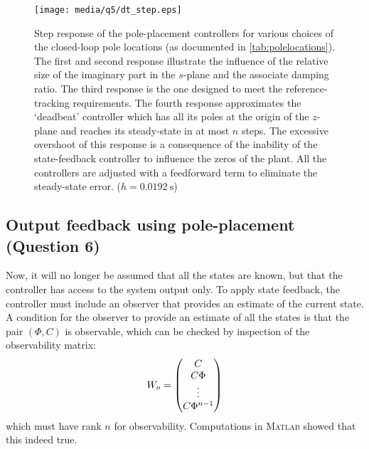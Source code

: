 \begin{figure}[ht]
    \centering
    \texttt{[image: media/q5/dt\_step.eps]}
    \caption{Step response of the pole-placement controllers for various choices of the closed-loop pole locations (as documented in \cref{tab:polelocations}). The first and second response illustrate the influence of the relative size of the imaginary part in the $s$-plane and the associate damping ratio. The third response is the one designed to meet the reference-tracking requirements. The fourth response approximates the `deadbeat' controller which has all its poles at the origin of the $z$-plane and reaches its steady-state in at most $n$ steps. The excessive overshoot of this response is a consequence of the inability of the state-feedback controller to influence the zeros of the plant. All the controllers are adjusted with a feedforward term to eliminate the steady-state error. ($h = \SI{0.0192}{\second}$)}
    \label{fig:q5_step}
\end{figure}

\subsection{Output feedback using pole-placement \textnormal{\phantom{xxx}(Question 6)}}
\label{sec:ss_output}
Now, it will no longer be assumed that all the states are known, but that the controller has access to the system output only. To apply state feedback, the controller must include an observer that provides an estimate of the current state. A condition for the observer to provide an estimate of all the states is that the pair $(\Phi, C)$ is observable, which can be checked by inspection of the observability matrix:
$$ W_o = \mqty(C\\C\Phi\\\vdots\\C\Phi^{n-1})$$
which must have rank $n$ for observability. Computations in \textsc{Matlab} showed that this indeed true.

